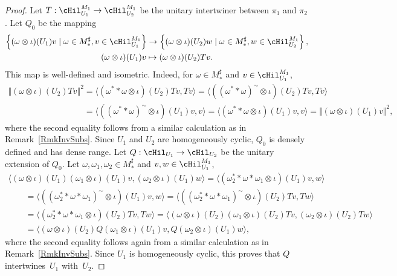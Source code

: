 \begin{proof}
Let $T: \cHil_{U_1}^{M_1} \rightarrow \cHil_{U_2}^{M_1} $ be the unitary intertwiner between $\pi_1$ and $\pi_2$. Let $Q_0$ be the mapping
\begin{gather*}
 \left\{ (\omega \otimes \iota)(U_1) v \mid \omega \in M_\ast^\sharp, v \in \cHil_{U_1}^{M_1} \right\}  \rightarrow
 \left\{ (\omega \otimes \iota)(U_2) w \mid \omega \in M_\ast^\sharp, w \in \cHil_{U_2}^{M_1} \right\}, \\
(\omega \otimes \iota)(U_1) v   \mapsto (\omega \otimes \iota)(U_2) T v.
\end{gather*}
This map is well-def\/ined and isometric. Indeed, for $\omega \in M_\ast^\sharp$ and $v \in \cHil_{U_1}^{M_1}$,
\begin{gather*}
  \Vert (\omega \otimes \iota)(U_2) T v \Vert^2 = \langle (\omega^\ast \ast \omega \otimes \iota)(U_2) T v, T v \rangle =
 \langle( (\omega^\ast \ast \omega )^\sim \otimes \iota)(U_2) T v, T v \rangle \\
 \phantom{\Vert (\omega \otimes \iota)(U_2) T v \Vert^2}{}  =
\langle( (\omega^\ast \ast \omega )^\sim\otimes \iota)(U_1)  v,  v \rangle =
 \langle (\omega^\ast \ast \omega \otimes \iota)(U_1)  v,  v \rangle =
 \Vert (\omega \otimes \iota)(U_1) v \Vert^2,
\end{gather*}
where the second equality follows from a similar calculation as in Remark~\ref{RmkInvSubs}.
Since $U_1$ and $U_2$ are homogeneously cyclic, $Q_0$ is densely def\/ined and has dense range. Let $Q: \cHil_{U_1} \rightarrow \cHil_{U_2}$ be the unitary extension of $Q_0$.  Let $\omega, \omega_1, \omega_2 \in M_\ast^\sharp$ and $v, w \in \cHil_{U_1}^{M_1}$,
\begin{gather*}
  \langle (\omega \otimes \iota)(U_1) (\omega_1 \otimes \iota)(U_1) v, (\omega_2 \otimes \iota)(U_1) w \rangle =
 \langle (\omega_2^\ast \ast \omega \ast \omega_1 \otimes \iota)(U_1)  v, w \rangle  \\
\qquad{}=  \langle ( (\omega_2^\ast \ast \omega \ast \omega_1)^\sim \otimes \iota)(U_1)  v, w \rangle =
 \langle ( (\omega_2^\ast \ast \omega \ast \omega_1)^\sim \otimes \iota)(U_2) T  v,  T w \rangle  \\
\qquad {} = \langle (\omega_2^\ast \ast \omega \ast \omega_1 \otimes \iota)(U_2) T  v,  T w \rangle =
\langle (\omega \otimes \iota)(U_2) (\omega_1 \otimes \iota)(U_2) T v, (\omega_2 \otimes \iota)(U_2) T w \rangle  \\
\qquad {}= \langle (\omega \otimes \iota)(U_2) Q (\omega_1 \otimes \iota)(U_1)  v, Q (\omega_2 \otimes \iota)(U_1)  w \rangle,
\end{gather*}
where the second equality follows again from a similar calculation as in Remark~\ref{RmkInvSubs}.
Since $U_1$ is homogeneously cyclic, this proves that $Q$ intertwines~$U_1$ with~$U_2$.
\end{proof}



